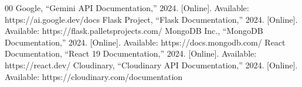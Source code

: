\documentclass[conference]{IEEEtran}
\begin{document}
\begin{thebibliography}{00}
 Google, ``Gemini API Documentation,'' 2024. [Online]. Available: https://ai.google.dev/docs
 Flask Project, ``Flask Documentation,'' 2024. [Online]. Available: https://flask.palletsprojects.com/
 MongoDB Inc., ``MongoDB Documentation,'' 2024. [Online]. Available: https://docs.mongodb.com/
 React Documentation, ``React 19 Documentation,'' 2024. [Online]. Available: https://react.dev/
 Cloudinary, ``Cloudinary API Documentation,'' 2024. [Online]. Available: https://cloudinary.com/documentation
\end{thebibliography}
\end{document}

